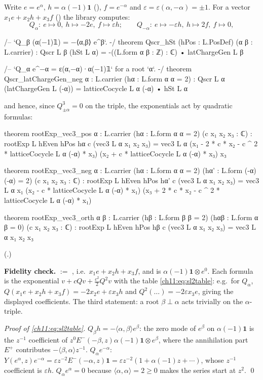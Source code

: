 Write $e=e^\alpha$, $h=\alpha(-1)\mathbf 1$ (), $f=e^{-\alpha}$ and
$\varepsilon=\varepsilon(\alpha,-\alpha)=\pm1$.  For a vector $x_1e+x_2h+x_3f$ ()
the library computes:
\begin{equation}\label{ch11:eq:sl2table}
  Q_\alpha:\ e\mapsto0,\ h\mapsto-2e,\ f\mapsto\varepsilon h;\qquad
  Q_{-\alpha}:\ e\mapsto-\varepsilon h,\ h\mapsto 2f,\ f\mapsto0,
\end{equation}
\begin{leancode}
/-- `Q_β (α(−1)𝟙) = −⟨α,β⟩ e^β`. -/
theorem Qscr_hSt (hPos : L.PosDef) (α β : L.carrier) :
    Qscr L β (hSt L α) = -((L.form α β : ℤ) : ℂ) • latChargeGen L β

/-- `Q_α e^{−α} = ε(α,−α)·α(−1)𝟙` for a root `α`. -/
theorem Qscr_latChargeGen_neg {α : L.carrier} (hα : L.form α α = 2) :
    Qscr L α (latChargeGen L (-α)) = latticeCocycle L α (-α) • hSt L α
\end{leancode}
and hence, since $Q_{\pm\alpha}^3=0$ on the triple, the exponentials act by quadratic formulas:
\begin{leancode}
theorem rootExp_vec3_pos {α : L.carrier} (hα : L.form α α = 2) (c x₁ x₂ x₃ : ℂ) :
    rootExp L hEven hPos hα c (vec3 L α x₁ x₂ x₃)
      = vec3 L α (x₁ - 2 * c * x₂ - c ^ 2 * latticeCocycle L α (-α) * x₃)
          (x₂ + c * latticeCocycle L α (-α) * x₃) x₃

theorem rootExp_vec3_neg {α : L.carrier} (hα : L.form α α = 2) (hα' : L.form (-α) (-α) = 2)
    (c x₁ x₂ x₃ : ℂ) :
    rootExp L hEven hPos hα' c (vec3 L α x₁ x₂ x₃)
      = vec3 L α x₁ (x₂ - c * latticeCocycle L α (-α) * x₁)
          (x₃ + 2 * c * x₂ - c ^ 2 * latticeCocycle L α (-α) * x₁)

theorem rootExp_vec3_orth {α β : L.carrier} (hβ : L.form β β = 2) (hαβ : L.form α β = 0)
    (c x₁ x₂ x₃ : ℂ) : rootExp L hEven hPos hβ c (vec3 L α x₁ x₂ x₃) = vec3 L α x₁ x₂ x₃
\end{leancode}
(.)
\begin{dictionary}
\textbf{Fidelity check.}   $:=$ , i.e.\ $x_1e+x_2h+x_3f$, and  is $\alpha(-1)\mathbf 1\otimes e^0$.  Each formula is the exponential $v+cQv+\tfrac{c^2}2Q^2v$ with
the table \eqref{ch11:eq:sl2table}: e.g.\ for $Q_\alpha$, $Q(x_1e+x_2h+x_3f)=-2x_2e+\varepsilon x_3h$
and $Q^2(\ldots)=-2\varepsilon x_3e$, giving the displayed coefficients.  The third statement: a
root $\beta\perp\alpha$ acts trivially on the $\alpha$-triple.
\end{dictionary}
\emph{Proof of \eqref{ch11:eq:sl2table}.}  $Q_\beta h=-\langle\alpha,\beta\rangle e^\beta$: the
zero mode of $e^\beta$ on $\alpha(-1)\mathbf 1$ is the $z^{-1}$ coefficient of
$z^{0}E^-(-\beta,z)\alpha(-1)\mathbf 1\otimes e^\beta$, where the annihilation part $E^+$ contributes
$-\langle\beta,\alpha\rangle z^{-1}$.  $Q_\alpha e^{-\alpha}$: $Y(e^\alpha,z)e^{-\alpha}=\varepsilon
z^{-2}E^-(-\alpha,z)\mathbf 1=\varepsilon z^{-2}(1+\alpha(-1)z+\cdots)$, whose $z^{-1}$ coefficient is
$\varepsilon h$.  $Q_\alpha e^\alpha=0$ because $\langle\alpha,\alpha\rangle=2\ge0$ makes the series start
at $z^{2}$. \qed

